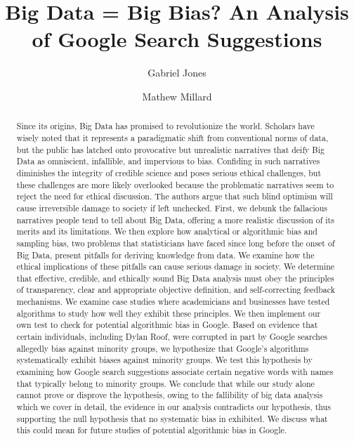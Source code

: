 \documentclass[sigconf]{acmart}
\begin{document}
\title{Big Data = Big Bias? An Analysis of Google Search Suggestions}

\author{Gabriel Jones}

\author{Mathew Millard}

\renewcommand{\shortauthors}{M. Millard}

\begin{abstract}
Since its origins, Big Data has promised to revolutionize the world. Scholars have wisely noted that it represents a paradigmatic shift from conventional norms of data, but the public has latched onto provocative but unrealistic narratives that deify Big Data as omniscient, infallible, and impervious to bias. Confiding in such narratives diminishes the integrity of credible science and poses serious ethical challenges, but these challenges are more likely overlooked because the problematic narratives seem to reject the need for ethical discussion. The authors argue that such blind optimism will cause irreversible damage to society if left unchecked. First, we debunk the fallacious narratives people tend to tell about Big Data, offering a more realistic discussion of its merits and its limitations. We then explore how analytical or algorithmic bias and sampling bias, two problems that statisticians have faced since long before the onset of Big Data, present pitfalls for deriving knowledge from data. We examine how the ethical implications of these pitfalls can cause serious damage in society. We determine that effective, credible, and ethically sound Big Data analysis must obey the principles of transparency, clear and appropriate objective definition, and self-correcting feedback mechanisms. We examine case studies where academicians and businesses have tested algorithms to study how well they exhibit these principles. We then implement our own test to check for potential algorithmic bias in Google. Based on evidence that certain individuals, including Dylan Roof, were corrupted in part by Google searches allegedly bias against minority groups, we hypothesize that Google's algorithms systematically exhibit biases against minority groups. We test this hypothesis by examining how Google search suggestions associate certain negative words with names that typically belong to minority groups. We conclude that while our study alone cannot prove or disprove the hypothesis, owing to the fallibility of big data analysis which we cover in detail, the evidence in our analysis contradicts our hypothesis, thus supporting the null hypothesis that no systematic bias in exhibited. We discuss what this could mean for future studies of potential algorithmic bias in Google.
\end{abstract}
\end{document}
